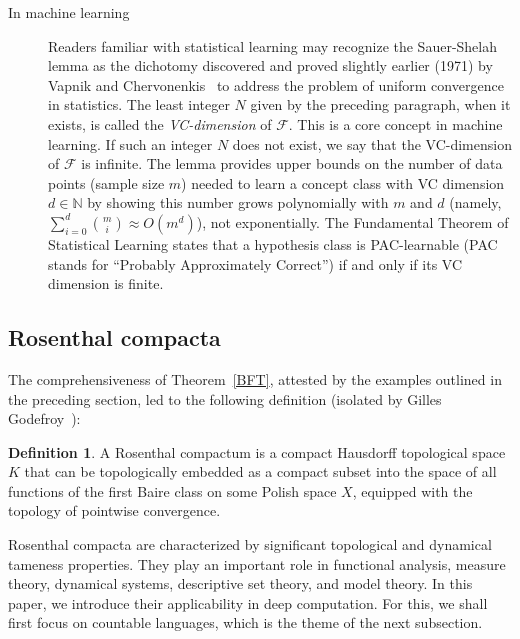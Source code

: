\documentclass[psamsfonts]{amsart}
\theoremstyle{definition}
\newtheorem{defn}[thm]{Definition}
\theoremstyle{remark}
\numberwithin{equation}{section}
\begin{document}
\begin{description}
 \item[In machine learning]
Readers familiar with statistical learning may recognize the Sauer-Shelah lemma as the dichotomy discovered and proved slightly  earlier (1971) by Vapnik and Chervonenkis~\cite{Vapnik-Chervonenkis:1971, Vapnik-Chervonenkis:1974} to address the problem of uniform convergence in statistics.
The least integer $N$ given by the preceding paragraph, when it exists, is called the \emph{VC-dimension} of $\mathscr{F}$.
This is a core concept in machine learning.
If such an integer $N$ does not exist, we say that the VC-dimension of $\mathscr{F}$ is infinite.
 The lemma provides upper bounds on the number of data points (sample size $m$) needed to learn a concept class with VC dimension $d\in\mathbb{N}$ by showing this number grows polynomially with $m$ and $d$ (namely, $\sum _{i=0}^{d}{m \choose i}\approx O(m^{d})$), not exponentially.
The Fundamental Theorem of Statistical Learning states that a hypothesis class is PAC-learnable (PAC stands for ``Probably Approximately Correct'') if and only if its VC dimension is finite.
 
\end{description}
 
\subsection{Rosenthal compacta}
 
 The comprehensiveness of Theorem~\ref{BFT}, attested by the examples outlined in the preceding section, led to the following definition (isolated by Gilles Godefroy~\cite{Godefroy:1980}):

\begin{defn}
\label{D:Rosenthal compacta}
A Rosenthal compactum  is a compact Hausdorff topological space \(K\) that can be topologically embedded as a compact subset into the space of all functions of the first Baire class on some Polish space \(X\), equipped with the topology of pointwise convergence.

\end{defn}


Rosenthal compacta are characterized by significant topological and dynamical tameness properties.
They play an important role in functional analysis,  measure theory, dynamical systems, descriptive set theory, and model theory.
In this paper, we introduce their applicability in deep computation.
For this, we shall first focus on countable languages, which is the theme of the next subsection.
\end{document}

